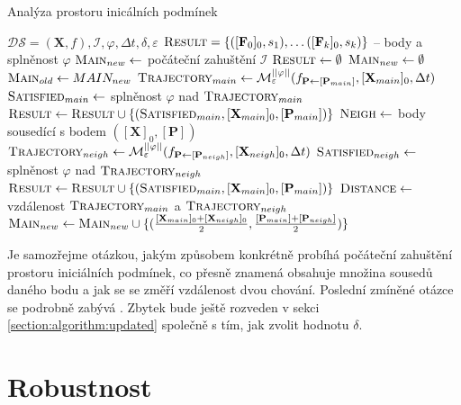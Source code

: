 \begin{algorithm}
\caption{Analýza prostoru inicálních podmínek}
\begin{algorithmic}
\REQUIRE 	$\mathcal{DS} = (\mathbf{X}, f), \mathcal{I}, \varphi, \Delta t, \delta, \varepsilon$
\ENSURE 	$\textsc{Result} = \{([\mathbf{F}_0]_0, s_1), \ldots ([\mathbf{F}_k]_0, s_k)\}$ -- body a splněnost $\varphi$
\STATE		$\textsc{Main}_{new} 	\gets $ počáteční zahuštění $\mathcal{I}$
\STATE		$\textsc{Result} \gets \emptyset$
	\STATE $\textsc{Main}_{new} \gets \emptyset$
	\STATE $\textsc{Main}_{old} \gets MAIN_{new}$
		\STATE $\textsc{Trajectory}_{main} \gets \mathcal{M}^{||\varphi||}_\varepsilon(f_{\mathbf{P} \gets [\mathbf{P}_{main}]}, [\mathbf{X}_{main}]_0, \Delta t)$
		\STATE $\textsc{Satisfied}_{main} \gets $ splněnost $\varphi$ nad $\textsc{Trajectory}_{main}$
		\STATE $\textsc{Result} \gets \textsc{Result} \cup \{(\textsc{Satisfied}_{main}, [\mathbf{X}_{main}]_0, [\mathbf{P}_{main}])\}$
		\STATE $\textsc{Neigh} \gets $ body sousedící s bodem $([\mathbf{X}]_0, [\mathbf{P}])$
			\STATE $\textsc{Trajectory}_{neigh} \gets \mathcal{M}^{||\varphi||}_\varepsilon(f_{\mathbf{P} \gets [\mathbf{P}_{neigh}]}, [\mathbf{X}_{neigh}]_0, \Delta t)$
			\STATE $\textsc{Satisfied}_{neigh} \gets $ splněnost $\varphi$ nad $\textsc{Trajectory}_{neigh}$
			\STATE $\textsc{Result} \gets \textsc{Result} \cup \{(\textsc{Satisfied}_{main}, [\mathbf{X}_{main}]_0, [\mathbf{P}_{main}])\}$
			\STATE $\textsc{Distance} \gets $ vzdálenost $\textsc{Trajectory}_{main}$ a $\textsc{Trajectory}_{neigh}$
				\STATE	$\textsc{Main}_{new} \gets \textsc{Main}_{new} \cup \{(\frac{[\mathbf{X}_{main}]_0 + [\mathbf{X}_{neigh}]_0}{2}, \frac{[\mathbf{P}_{main}] + [\mathbf{P}_{neigh}]}{2})\}$
			\ENDIF
		\ENDFOR
	\ENDFOR
\ENDWHILE
\end{algorithmic}
\end{algorithm}

Je samozřejme otázkou, jakým způsobem konkrétně probíhá počáteční zahuštění prostoru
iniciálních podmínek, co přesně znamená obsahuje mno\-žina sousedů daného bodu a jak
se se změří vzdálenost dvou chování. Poslední zmíněné otázce se podrobně zabývá \cite{drazan2011}.
Zbytek bude ještě rozveden v sekci \ref{section:algorithm:updated} společně s tím,
jak zvolit hodnotu $\delta$.

\section{Robustnost}\label{section:robustness}

